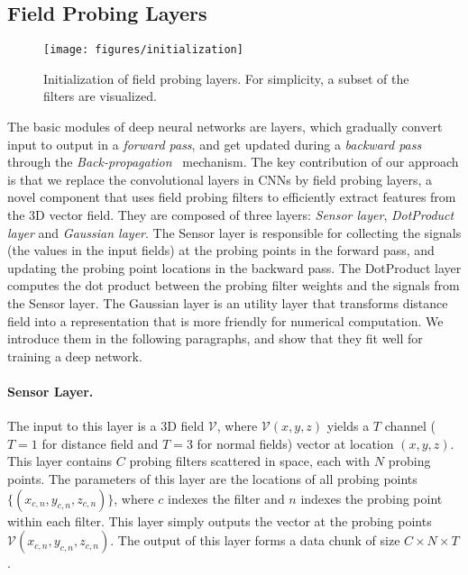 \documentclass{article}
\begin{document}
\subsection{Field Probing Layers}
\label{sec:fpnn_layers}

\begin{wrapfigure}{R}{0.5\linewidth}
	\vspace{-1.8cm}
	\begin{center}
		\texttt{[image: figures/initialization]}
	\end{center}
	\vspace{-0.4cm}
	\caption{Initialization of field probing layers. For simplicity, a subset of the filters are visualized.}
	\label{fig:initialization}
	\vspace{-0.3cm}
\end{wrapfigure}

The basic modules of deep neural networks are layers, which gradually convert input to output in a \emph{forward pass}, and get updated during a \emph{backward pass} through the \emph{Back-propagation}~\cite{Williams_Nature86_Learning} mechanism.
The key contribution of our approach is that we replace the convolutional layers in CNNs by field probing layers, a novel component that uses field probing filters to efficiently extract features from the 3D vector field. They are composed of three layers: \emph{Sensor layer}, \emph{DotProduct layer} and \emph{Gaussian layer}. The Sensor layer is responsible for collecting the signals (the values in the input fields) at the probing points in the forward pass, and updating the probing point locations in the backward pass. The DotProduct layer computes the dot product between the probing filter weights and the signals from the Sensor layer. The Gaussian layer is an utility layer that transforms distance field into a representation that is more friendly for numerical computation. We introduce them in the following paragraphs, and show that they fit well for training a deep network.

\paragraph{Sensor Layer.} The input to this layer is a 3D field $\mathcal{V}$, where $\mathcal{V}(x,y,z)$ yields a $T$ channel ($T=1$ for distance field and $T=3$ for normal fields) vector at location $(x,y,z)$. This layer contains $C$ probing filters scattered in space, each with $N$ probing points. The parameters of this layer are the locations of all probing points $\{(x_{c,n},y_{c,n},z_{c,n})\}$, where $c$ indexes the filter and $n$ indexes the probing point within each filter. This layer simply outputs the vector at the probing points $\mathcal{V}(x_{c,n},y_{c,n},z_{c,n})$. The output of this layer forms a data chunk of size $C \times N \times T$.
\end{document}
